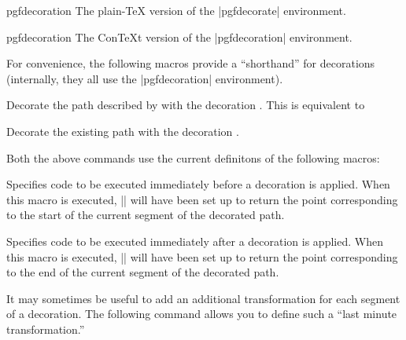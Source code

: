 \begin{plainenvironment}{{pgfdecoration}}
  The plain-\TeX{} version of the |{pgfdecorate}| environment.
\end{plainenvironment}

\begin{contextenvironment}{{pgfdecoration}}
  The Con\TeX t version of the |{pgfdecoration}| environment.
\end{contextenvironment}

For convenience, the following macros provide a ``shorthand''
for decorations (internally, they all use the |{pgfdecoration}|
environment).

\begin{command}{\pgfdecoratepath{}}
	Decorate the path described by  with the
	decoration . This is equivalent to
\end{command}

\begin{command}{\pgfdecoratecurrentpath{}}
	Decorate the existing path with the	decoration .
\end{command}

Both the above commands use the current definitons of the following
macros:

\begin{command}{\pgfdecoratebeforecode}
  Specifies code to be executed immediately before a decoration is 
  applied.
  When this macro is executed, |\pgfpointdecoratedpathfirst| will 
  have been set up to return the point corresponding to the start 
  of the current segment of the decorated path.
\end{command}

\begin{command}{\pgfdecorateaftercode}
  Specifies code to be executed immediately after a decoration is 
  applied.
  When this macro is executed, |\pgfpointdecoratedpathlast| will 
  have been set up  to return the point corresponding	to the end
  of the current segment of the decorated path.
\end{command}


It may sometimes be useful to add an additional transformation
for each segment of a decoration. The following command allows 
you to define such a ``last minute transformation.''

